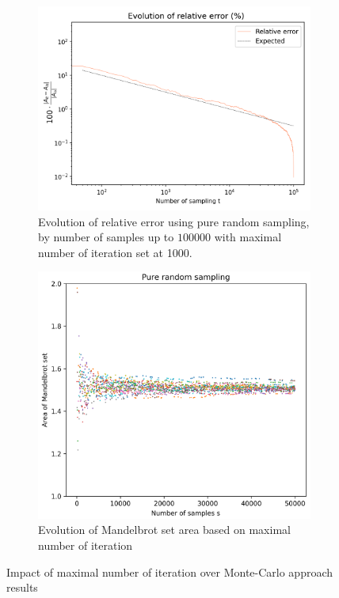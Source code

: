 \documentclass{article}
\begin{document}
    \begin{figure}[h]
        \centering
        \begin{subfigure}[t]{.48\linewidth}
            \includegraphics[width=\textwidth]{pictures/part_2/number_samples_convergence.png}
            \caption{Evolution of relative error using pure random sampling, by number of samples up to $100000$ with maximal number of iteration set at 1000.}
            \label{fig:samples_relative_error}
        \end{subfigure}
        \begin{subfigure}[t]{.47\linewidth}
            \centering
            \includegraphics[width=\textwidth]{pictures/part_2/number_samples_area_50_simulations.png}
            \caption{Evolution of Mandelbrot set area based on maximal number of iteration}
            \label{fig:samples_area_evolution}
        \end{subfigure}

        \caption{Impact of maximal number of iteration over Monte-Carlo approach results}
        \label{fig:samples}
    \end{figure}
\end{document}
